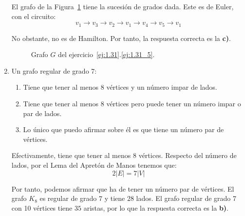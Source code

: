 \begin{ejercicio}
\begin{enumerate}
        El grafo de la Figura~\ref{fig:1.31_5} tiene la sucesión de grados dada. Este es de Euler, con el circuito:
        \begin{equation*}
            v_1\to v_3\to v_2\to v_1\to v_4\to v_5\to v_1
        \end{equation*}

        No obstante, no es de Hamilton. Por tanto, la respuesta correcta es la \textbf{c)}.
        \begin{figure}
            \centering
            \caption{Grafo $G$ del ejercicio~\ref{ej:1.31}.\ref{ej:1.31_5}.}
            \label{fig:1.31_5}
        \end{figure}
        \item Un grafo regular de grado 7:
        \begin{enumerate}
            \item Tiene que tener al menos 8 vértices y un número impar de lados.
            \item Tiene que tener al menos 8 vértices pero puede tener un número impar o par de lados.
            \item Lo único que puedo afirmar sobre él es que tiene un número par de vértices.
        \end{enumerate}

        Efectivamente, tiene que tener al menos $8$ vértices. Respecto del número de lados, por el Lema del Apretón de Manos tenemos que:
        \begin{equation*}
            2|E|=7|V|
        \end{equation*}

        Por tanto, podemos afirmar que ha de tener un número par de vértices. El grafo $K_8$ es regular de grado $7$ y tiene $28$ lados. El grafo regular de grado 7 con 10 vértices tiene $35$ aristas, por lo que la respuesta correcta es la \textbf{b)}.
    \end{enumerate}
\end{ejercicio}


